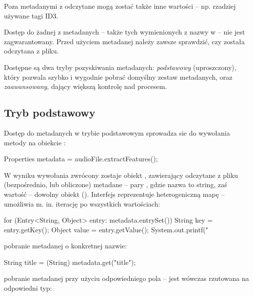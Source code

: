 \begin{Note}
Poza metadanymi z  odczytane mogą zostać także inne wartości -- np. rzadziej
używane tagi ID3.
\end{Note}

\begin{Caution}
Dostęp do żadnej z metadanych -- także tych wymienionych z nazwy w  -- nie jest
zagwarantowany.  Przed użyciem metadanej należy zawsze sprawdzić, czy została odczytana z pliku.
\end{Caution}

Dostępne są dwa tryby pozyskiwania metadanych: \emph{podstawowy} (uproszczony), który pozwala szybko
i wygodnie pobrać domyślny zestaw metadanych, oraz \emph{zaawansowany}, dający większą kontrolę nad
procesem.

\subsection{Tryb podstawowy}


Dostęp do metadanych w trybie podstawowym sprowadza sie do wywołania metody 
na obiekcie :

\begin{java}
Properties metadata = audioFile.extractFeatures();
\end{java}

W wyniku wywołania zwrócony zostaje obiekt ,
zawierający odczytane z pliku (bezpośrednio, lub obliczone) metadane -- pary , gdzie nazwa to string, zaś wartość -- dowolny obiekt ().
Interfejs  reprezentuje heterogeniczną mapę -- umożliwia m. in. iterację po
wszystkich wartościach:

\begin{java}
for (Entry<String, Object> entry: metadata.entrySet()) {
    String key = entry.getKey();
    Object value = entry.getValue();
    System.out.printf("%
}
\end{java}

pobranie metadanej o konkretnej nazwie:

\begin{java}
String title = (String) metadata.get("title");
\end{java}

pobranie metadanej przy użyciu odpowiedniego pola  -- jest wówczas rzutowana na
odpowiedni typ:

